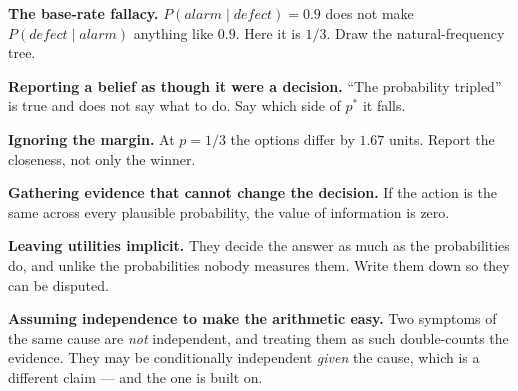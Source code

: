 \begin{pitfall}
\begin{tight}
  \item \textbf{The base-rate fallacy.} $P(\mathit{alarm} \mid \mathit{defect})
        = 0.9$ does not make $P(\mathit{defect} \mid \mathit{alarm})$ anything like
        $0.9$. Here it is $1/3$. Draw the natural-frequency tree.
  \item \textbf{Reporting a belief as though it were a decision.} ``The probability
        tripled'' is true and does not say what to do. Say which side of $p^{*}$ it
        falls.
  \item \textbf{Ignoring the margin.} At $p = 1/3$ the options differ by $1.67$
        units. Report the closeness, not only the winner.
  \item \textbf{Gathering evidence that cannot change the decision.} If the action
        is the same across every plausible probability, the value of information is
        zero.
  \item \textbf{Leaving utilities implicit.} They decide the answer as much as the
        probabilities do, and unlike the probabilities nobody measures them. Write
        them down so they can be disputed.
  \item \textbf{Assuming independence to make the arithmetic easy.} Two symptoms of
        the same cause are \emph{not} independent, and treating them as such
        double-counts the evidence. They may be conditionally independent
        \emph{given} the cause, which is a different claim --- and the one
         is built on.
\end{tight}
\end{pitfall}

